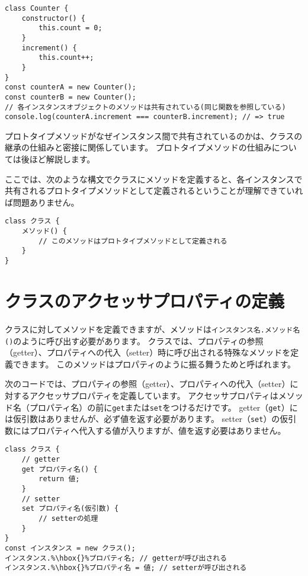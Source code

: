 \begin{lstlisting}
class Counter {
    constructor() {
        this.count = 0;
    }
    increment() {
        this.count++;
    }
}
const counterA = new Counter();
const counterB = new Counter();
// 各インスタンスオブジェクトのメソッドは共有されている(同じ関数を参照している)
console.log(counterA.increment === counterB.increment); // => true
\end{lstlisting}

プロトタイプメソッドがなぜインスタンス間で共有されているのかは、クラスの継承の仕組みと密接に関係しています。
プロトタイプメソッドの仕組みについては後ほど解説します。

ここでは、次のような構文でクラスにメソッドを定義すると、各インスタンスで共有されるプロトタイプメソッドとして定義されるということが理解できていれば問題ありません。

\begin{lstlisting}
class クラス {
    メソッド() {
        // このメソッドはプロトタイプメソッドとして定義される
    }
}
\end{lstlisting}

\hypertarget{class-accessor-property}{%
\section{クラスのアクセッサプロパティの定義}\label{class-accessor-property}}

クラスに対してメソッドを定義できますが、メソッドは\texttt{インスタンス名.メソッド名()}のように呼び出す必要があります。
クラスでは、プロパティの参照（getter）、プロパティへの代入（setter）時に呼び出される特殊なメソッドを定義できます。
このメソッドはプロパティのように振る舞うため\textbf{}と呼ばれます。

次のコードでは、プロパティの参照（getter）、プロパティへの代入（setter）に対するアクセッサプロパティを定義しています。
アクセッサプロパティはメソッド名（プロパティ名）の前に\texttt{get}または\texttt{set}をつけるだけです。
getter（\texttt{get}）には仮引数はありませんが、必ず値を返す必要があります。
setter（\texttt{set}）の仮引数にはプロパティへ代入する値が入りますが、値を返す必要はありません。

\begin{lstlisting}[escapechar=\%]
class クラス {
    // getter
    get プロパティ名() {
        return 値;
    }
    // setter
    set プロパティ名(仮引数) {
        // setterの処理
    }
}
const インスタンス = new クラス();
インスタンス.%\hbox{}%プロパティ名; // getterが呼び出される
インスタンス.%\hbox{}%プロパティ名 = 値; // setterが呼び出される
\end{lstlisting}

